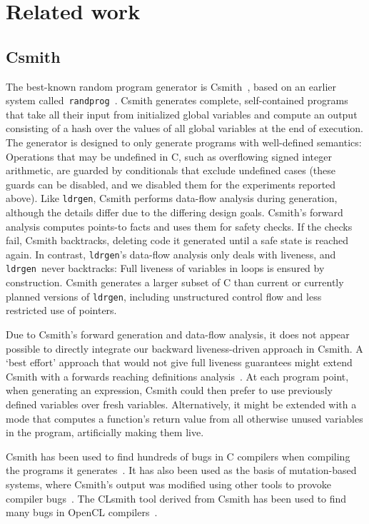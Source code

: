 \documentclass{llncs}
\newcommand\ldrgen{\texttt{ldrgen}}
\begin{document}
\section{Related work}

\subsection{Csmith}
\label{sec:csmith}

The best-known random program generator is Csmith~\cite{csmith-2011}, based
on an earlier system
called~\texttt{randprog}~\cite{eide.regehr-2008,randprog-2007}. Csmith
generates complete, self-contained programs that take all their input from
initialized global variables and compute an output consisting of a hash over
the values of all global variables at the end of execution. The generator is
designed to only generate programs with well-defined semantics: Operations
that may be undefined in C, such as overflowing signed integer arithmetic,
are guarded by conditionals that exclude undefined cases (these guards can
be disabled, and we disabled them for the experiments reported above). Like
\ldrgen, Csmith performs data-flow analysis during generation, although the
details differ due to the differing design goals. Csmith's forward analysis
computes points-to facts and uses them for safety checks. If the checks
fail, Csmith backtracks, deleting code it generated until a safe state is
reached again. In contrast, \ldrgen's data-flow analysis only deals with
liveness, and \ldrgen\ never backtracks: Full liveness of variables in loops
is ensured by construction. Csmith generates a larger subset of C than
current or currently planned versions of \ldrgen, including unstructured
control flow and less restricted use of pointers.

Due to Csmith's forward generation and data-flow analysis, it does not
appear possible to directly integrate our backward liveness-driven approach
in Csmith. A `best effort' approach that would not give full liveness
guarantees might extend Csmith with a forwards reaching definitions
analysis~\cite{nielson.etal-1999}. At each program point, when generating an
expression, Csmith could then prefer to use previously defined variables
over fresh variables. Alternatively, it might be extended with a mode that
computes a function's return value from all otherwise unused variables in
the program, artificially making them live.

Csmith has been used to find hundreds of bugs in C compilers when compiling
the programs it generates~\cite{csmith-2011}. It has also been used as the
basis of mutation-based systems, where Csmith's output was modified using
other tools to provoke compiler bugs~\cite{le.etal-2014}. The CLsmith tool
derived from Csmith has been used to find many bugs in OpenCL
compilers~\cite{lidbury.etal-2015}.
\end{document}
